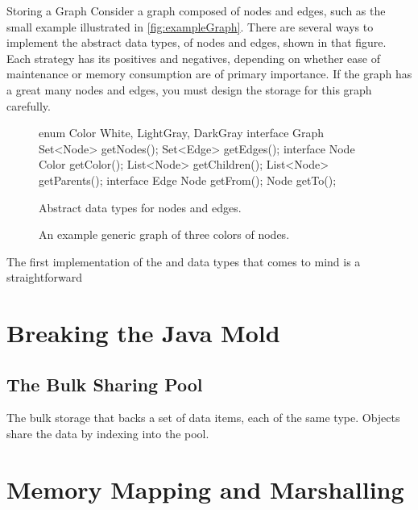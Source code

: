 \begin{example}{Storing a Graph}
Consider a graph composed of nodes and edges, such as the small
example illustrated in  \autoref{fig:exampleGraph}. There are several ways to
implement the abstract data types, of nodes and edges, shown in that figure.
Each strategy has its positives and negatives, depending on whether ease of
maintenance or memory consumption are of primary importance.
If the graph has a great many nodes and edges, you must design the storage
for this graph carefully.
\end{example}

\begin{figure}
\centering
{}
\begin{subfloat}
\begin{minipage}[b]{0.65\textwidth}
\begin{shortlisting}
enum Color {
	White, LightGray, DarkGray
}
interface Graph {
	Set<Node> getNodes();
	Set<Edge> getEdges();
}
interface Node {
	Color getColor();
	List<Node> getChildren();
	List<Node> getParents();
}
interface Edge {
	Node getFrom();
	Node getTo();
}
\end{shortlisting}
\end{minipage}
\caption{Abstract data types for nodes and edges.}
\end{subfloat}
	\caption{An example generic graph of three colors of nodes.}
	\label{fig:exampleGraph}
\end{figure}

The first implementation of the  and  data types that
comes to mind is a straightforward


\section{Breaking the Java Mold}
\label{sec:fortran-style}

\subsection{The Bulk Sharing Pool}
\label{sec:bulk-sharing-pool}

The bulk storage that backs a set of data items, each of the same type. Objects
share the data by indexing into the pool.

\section{Memory Mapping and Marshalling}